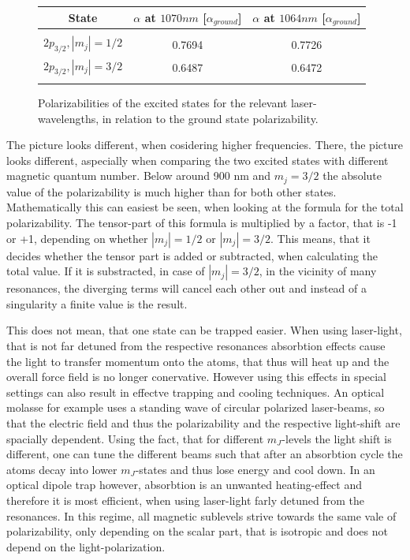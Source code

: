 \begin{figure}[h]
\begin{center}
\begin{tabular}{ccc}
State&$\alpha$ at $1070\unit{nm}$ [$\unit{\alpha_{ground}}$]&$\alpha$ at $1064\unit{nm}$ [$\unit{\alpha_{ground}}$]\\\hline\hline\\
$2p_{3/2}, |m_j|=1/2$&0.7694&0.7726\\
$2p_{3/2}, |m_j|=3/2$&0.6487&0.6472\\
\\\hline
\end{tabular}
\end{center}
\caption{Polarizabilities of the excited states for the relevant laser-wavelengths, in relation to the ground state polarizability.}
\label{relativealpha}
\end{figure}

The picture looks different, when cosidering higher frequencies. There, the picture looks different, aspecially when comparing the two excited states with different magnetic quantum number. Below around 900 nm and $m_j=3/2$ the absolute value of the polarizability is much higher than for both other states. Mathematically this can easiest be seen, when looking at the formula for the total polarizability. The tensor-part of this formula is multiplied by a factor, that is -1 or +1, depending on whether $|m_j|=1/2$ or $|m_j|=3/2$. This means, that it decides whether the tensor part is added or subtracted, when calculating the total value. If it is substracted, in case of $|m_j|=3/2$, in the vicinity of many resonances, the diverging terms will cancel each other out and instead of a singularity a finite value is the result.

This does not mean, that one state can be trapped easier. When using laser-light, that is not far detuned from the respective resonances absorbtion effects cause the light to transfer momentum onto the atoms, that thus will heat up and the overall force field is no longer conervative. However using this effects in special settings can also result in effectve trapping and cooling techniques. An optical molasse for example uses a standing wave of circular polarized laser-beams, so that the electric field and thus the polarizability and the respective light-shift are spacially dependent. Using the fact, that for different $m_J$-levels the light shift is different, one can tune the different beams such that after an absorbtion cycle the atoms decay into lower $m_J$-states and thus lose energy and cool down. In an optical dipole trap however, absorbtion is an unwanted heating-effect and therefore it is most efficient, when using laser-light farly detuned from the resonances. In this regime, all magnetic sublevels strive towards the same vale of polarizability, only depending on the scalar part, that is isotropic and does not depend on the light-polarization.

